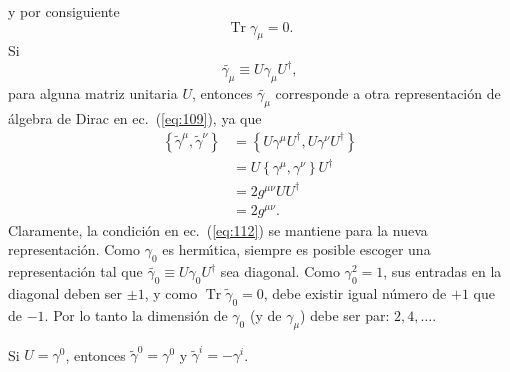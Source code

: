 y por consiguiente
\begin{equation}
  \operatorname{Tr}\gamma_\mu=0.
\end{equation}
Si
\begin{equation}
  \tilde{\gamma_\mu}\equiv U\gamma_\mu U^\dagger,
\end{equation}
para alguna matriz unitaria $U$, entonces $\tilde{\gamma_\mu}$ corresponde a otra representaci\'on de \'algebra de Dirac en ec.~(\ref{eq:109}), ya que
\begin{align}
  \left\{\tilde\gamma^\mu,\tilde\gamma^\nu\right\}&=\left\{U\gamma^\mu U^\dagger,U\gamma^\nu U^\dagger\right\}\nonumber\\
  &=U\left\{\gamma^\mu,\gamma^\nu\right\}U^\dagger\nonumber\\
  &=2g^{\mu\nu}UU^\dagger\nonumber\\
  &=2g^{\mu\nu}.
\end{align}
Claramente, la condici\'on en ec.~(\ref{eq:112}) se mantiene para la nueva representaci\'on. Como $\gamma_0$ es herm\'\i tica, siempre es posible escoger una representaci\'on tal que $\tilde{\gamma_0}\equiv U\gamma_0U^\dagger$ sea diagonal. Como $\gamma_0^2=1$, sus entradas en la diagonal deben ser $\pm1$, y como $\operatorname{Tr}\tilde\gamma_0=0$, debe existir igual n\'umero de $+1$ que de $-1$. Por lo tanto la dimensi\'on de $\gamma_0$ (y de $\gamma_\mu$) debe ser par: $2,4,\ldots$. 

Si $U=\gamma^0$, entonces $\tilde\gamma^0=\gamma^0$ y $\tilde\gamma^i=-\gamma^i$. 

